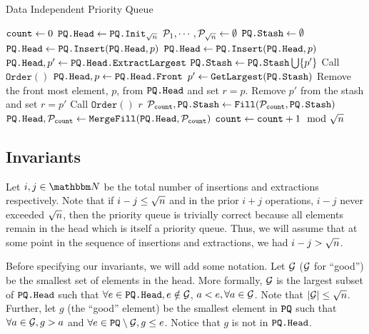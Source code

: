 	
\begin{algorithm}
	\caption{Data Independent Priority Queue}
	\label{alg:DIQueue}
	\begin{algorithmic}[1]
		\Function{$\PQInit$}{}
		\State ${\texttt{count}} \gets 0$
		\State $\texttt{PQ.Head} \gets \texttt{PQ.Init}_{\sqrt{n}}$
		\State $\mathcal{P}_1, \cdots, \mathcal{P}_{\sqrt{n}} \gets \emptyset$
		\State $\texttt{PQ.Stash} \gets \emptyset$
		\EndFunction
		\If{$|\PQhead| < \sqrtn$}
		\State $\texttt{PQ.Head} \gets \texttt{PQ.Insert}(\texttt{PQ.Head}, p)$
		\Else
		\State $\texttt{PQ.Head} \gets \texttt{PQ.Insert}(\texttt{PQ.Head}, p)$
		\State $\texttt{PQ.Head}, p' \gets \texttt{PQ.Head.ExtractLargest}$ \label{algline:PQExtractIns}
		\State $\texttt{PQ.Stash} \gets \texttt{PQ.Stash} \bigcup \{p'\}$
		\EndIf
		\State Call $\texttt{Order}()$ \label{algline:PQOrderIns}
		\EndFunction
		\Function{$\PQExtract$}{}
		\State $\texttt{PQ.Head}, p \gets \texttt{PQ.Head}\texttt{.Front}$
		\State $p' \gets \texttt{GetLargest}(\texttt{PQ.Stash})$
		 Remove the front most element, $p$, from $\texttt{PQ.Head}$ and set $r = p$.
		\Else \; Remove $p'$ from the stash and set $ r = p'$
		\EndIf
		\State Call $\texttt{Order}()$
		\State \Return $r$
		\EndFunction
		\Function{$\PQOrder$}{}
		\State $\mathcal{P}_{{\texttt{count}}}, \texttt{PQ.Stash} \gets \texttt{Fill}(\mathcal{P}_{\texttt{count}}, \texttt{PQ.Stash})$
		\State $\texttt{PQ.Head}, \mathcal{P}_{\texttt{count}} \gets \texttt{MergeFill}(\texttt{PQ.Head}, \mathcal{P}_{\texttt{count}})$
		\State ${\texttt{count}} \gets {\texttt{count}} + 1 \mod {{\sqrt{n}}}$
		\EndFunction
	\end{algorithmic}
\end{algorithm}


\subsection{Invariants}
\label{subsec:invariants}
Let $i, j \in \N$ be the total number of insertions and extractions respectively. Note that if $i - j \leq {\sqrt{n}}$
and in the prior $i + j$ operations, $i - j$ never exceeded ${\sqrt{n}}$, then the priority queue is trivially correct because all elements remain in the head which is itself a priority queue.
Thus, we will assume that at some point in the sequence of insertions and extractions, we had $i - j > {\sqrt{n}}$.

Before specifying our invariants, we will add some notation. Let $\mathcal{G}$ ($\mathcal{G}$ for ``good'') be the smallest set of elements in the head. More formally,
$\mathcal{G}$ is the largest subset of $\texttt{PQ.Head}$ such that $\forall e \in \texttt{PQ.Head}, e \notin \mathcal{G}$, $a < e, \forall a \in \mathcal{G}$. Note that $|\mathcal{G}| \leq {\sqrt{n}}$.
Further, let $g$ (the ``good'' element) be the smallest element in $\texttt{PQ}$ such that $\forall a \in \mathcal{G}, g > a$ and $\forall e \in \texttt{PQ} \setminus \mathcal{G}, g \leq e$.
Notice that $g$ is not in $\texttt{PQ.Head}$.

